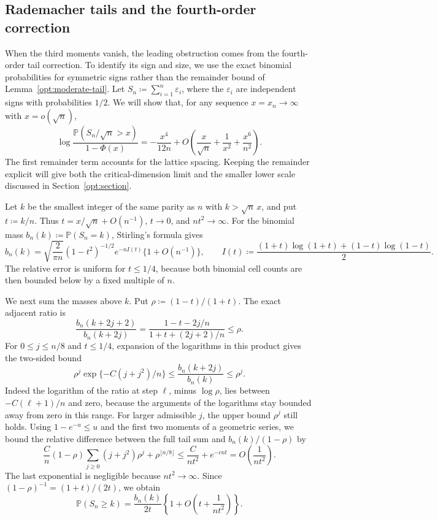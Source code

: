 \documentclass[11pt,letterpaper]{article}
\theoremstyle{remark}
\newcommand{\Pp}{\mathbb P}
\begin{document}
\subsection{Rademacher tails and the fourth-order correction}
\label{app:rademacher-tail}
When the third moments vanish, the leading obstruction comes from the
fourth-order tail correction. To identify its sign and size, we use
the exact binomial probabilities for symmetric signs rather than the
remainder bound of Lemma~\ref{opt:moderate-tail}.
Let \(S_n\coloneqq\sum_{i=1}^n\varepsilon_i\), where the
\(\varepsilon_i\) are independent signs with probabilities \(1/2\).
We will show that, for any sequence \(x=x_n\to\infty\) with
\(x=o(\sqrt n)\),
\begin{equation}
 \log\frac{\Pp(S_n/\sqrt n>x)}{1-\Phi(x)}
 =-\frac{x^4}{12n}
   +O\!\left(\frac{x}{\sqrt n}+\frac1{x^2}
                    +\frac{x^6}{n^2}\right).
 \label{app:rad-tail-expansion}
\end{equation}
The first remainder term accounts for the lattice spacing. Keeping
the remainder explicit will give both the critical-dimension limit
and the smaller lower scale discussed in Section~\ref{opt:section}.

Let \(k\) be the smallest integer of the same parity as \(n\) with
\(k>\sqrt n\,x\), and put \(t\coloneqq k/n\). Thus
\(t=x/\sqrt n+O(n^{-1})\), \(t\to0\), and \(nt^2\to\infty\).
For the binomial mass \(b_n(k)\coloneqq\Pp(S_n=k)\), Stirling's
formula gives
\begin{equation}
 b_n(k)=\sqrt{\frac2{\pi n}}(1-t^2)^{-1/2}
             e^{-nI(t)}\{1+O(n^{-1})\},\qquad
 I(t)\coloneqq\frac{(1+t)\log(1+t)+(1-t)\log(1-t)}2.
 \label{app:rad-mass}
\end{equation}
The relative error is uniform for \(t\le1/4\), because both
binomial cell counts are then bounded below by a fixed multiple of \(n\).

We next sum the masses above \(k\). Put
\(\rho\coloneqq(1-t)/(1+t)\). The exact adjacent ratio is
\[
 \frac{b_n(k+2j+2)}{b_n(k+2j)}
 =\frac{1-t-2j/n}{1+t+(2j+2)/n}\le\rho.
\]
For \(0\le j\le n/8\) and \(t\le1/4\), expansion of the logarithms
in this product gives the two-sided bound
\[
 \rho^j\exp\{-C(j+j^2)/n\}
 \le\frac{b_n(k+2j)}{b_n(k)}\le\rho^j.
\]
Indeed the logarithm of the ratio at step \(\ell\), minus
\(\log\rho\), lies between \(-C(\ell+1)/n\) and zero, because the
arguments of the logarithms stay bounded away from zero in this range.
For larger admissible \(j\), the upper bound \(\rho^j\) still holds.
Using \(1-e^{-u}\le u\) and the first two moments of a geometric
series, we bound the relative difference between the full tail sum and
\(b_n(k)/(1-\rho)\) by
\[
 \frac Cn(1-\rho)\sum_{j\ge0}(j+j^2)\rho^j
       +\rho^{\lfloor n/8\rfloor}
 \le \frac{C}{nt^2}+e^{-c nt}
 =O\!\left(\frac1{nt^2}\right).
\]
The last exponential is negligible because \(nt^2\to\infty\).
Since \((1-\rho)^{-1}=(1+t)/(2t)\), we obtain
\begin{equation}
 \Pp(S_n\ge k)
 =\frac{b_n(k)}{2t}
       \left\{1+O\!\left(t+\frac1{nt^2}\right)\right\}.
 \label{app:rad-tail-sum}
\end{equation}
\end{document}
